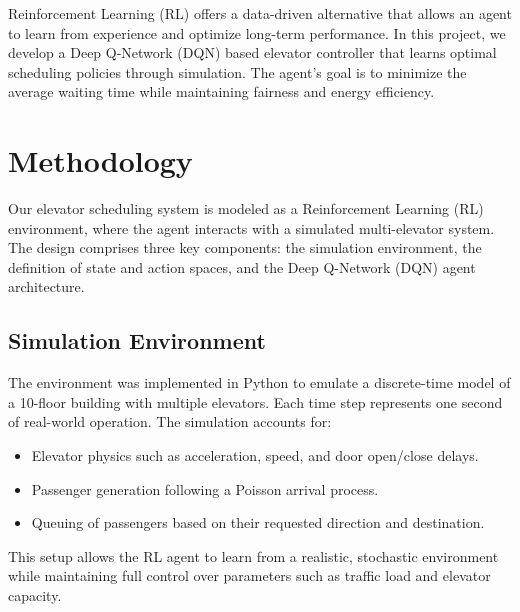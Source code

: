 \documentclass[conference]{IEEEtran}
\begin{document}
Reinforcement Learning (RL) offers a data-driven alternative that allows an agent to learn from experience and optimize long-term performance.\cite{sutton2018reinforcement} In this project, we develop a Deep Q-Network (DQN) based elevator controller that learns optimal scheduling policies through simulation.\cite{mnih2015human, luo2020deep} The agent’s goal is to minimize the average waiting time while maintaining fairness and energy efficiency.

\section{Methodology}
Our elevator scheduling system is modeled as a Reinforcement Learning (RL) environment, where the agent interacts with a simulated multi-elevator system. The design comprises three key components: the simulation environment, the definition of state and action spaces, and the Deep Q-Network (DQN) agent architecture.

\subsection{Simulation Environment}
The environment was implemented in Python to emulate a discrete-time model of a 10-floor building with multiple elevators. Each time step represents one second of real-world operation. The simulation accounts for:
\begin{itemize}
    \item Elevator physics such as acceleration, speed, and door open/close delays.
    \item Passenger generation following a Poisson arrival process.
    \item Queuing of passengers based on their requested direction and destination.
\end{itemize}
This setup allows the RL agent to learn from a realistic, stochastic environment while maintaining full control over parameters such as traffic load and elevator capacity.
\end{document}
